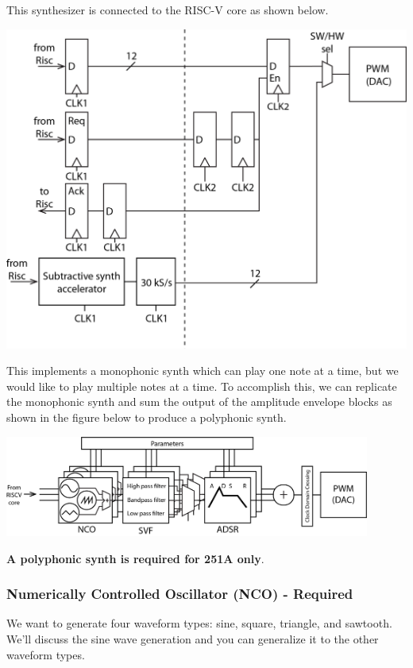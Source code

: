 \documentclass[11pt]{article}
\begin{document}
This synthesizer is connected to the RISC-V core as shown below.
\begin{center}
  \includegraphics[width=\textwidth/2]{images/fourPhase_2.png}
\end{center}

This implements a monophonic synth which can play one note at a time, but we would like to play multiple notes at a time.
To accomplish this, we can replicate the monophonic synth and sum the output of the amplitude envelope blocks as shown in the figure below to produce a polyphonic synth.

\begin{center}
  \includegraphics[width=0.9\textwidth]{images/ss_dp_2.png}
\end{center}

\textbf{A polyphonic synth is required for 251A only}.

\subsubsection{Numerically Controlled Oscillator (NCO) - Required}
We want to generate four waveform types: sine, square, triangle, and sawtooth.
We'll discuss the sine wave generation and you can generalize it to the other waveform types.
\end{document}
